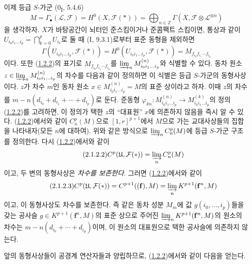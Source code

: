 \begin{env}[2.1.2]
\label{III.2.1.2-fr}
이제 등급 $S$-가군 (0\textsubscript{I}, 5.4.6)
\begin{equation}
\label{III.2.1.2.1-fr}
\tag{2.1.2.1}
M=\Gamma_\bullet(\mathcal L,\mathcal F)
=H^0(X,\mathcal F(*))
=\bigoplus_{n\in\mathbb Z}
\Gamma(X,\mathcal F\otimes\mathcal L^{\otimes n})
\end{equation}
을 생각하자.
$X$가 바탕공간이 뇌터인 준스킴이거나 준콤팩트 스킴이면, 통상과 같이
$U_{i_0i_1\ldots i_p}=\bigcap_{k=0}^pU_{i_k}$로 둘 때 (I, 9.3.1)로부터
표준 동형을 제외하면
\[
\Gamma(U_{i_0i_1\ldots i_p},\mathcal F(*))
=H^0(U_{i_0i_1\ldots i_p},\mathcal F(*))
=M_{f_{i_0}f_{i_1}\cdots f_{i_p}}
\]
이다. 또한 (\hyperref[III.1.2.2-fr]{1.2.2})의 표기로
$M_{f_{i_0}f_{i_1}\cdots f_{i_p}}$를
$\varinjlim_n M_{i_0i_1\ldots i_p}^{(n)}$와 식별할 수 있다. 동차 원소
$z\in\varinjlim_n M_{i_0i_1\ldots i_p}^{(n)}$의 차수를 다음과 같이
정의하면 이 식별은 등급 $S$-가군의 동형사상이다. $z$가 차수 $m$인
동차 원소
$x\in M_{i_0i_1\ldots i_p}^{(n)}=M$의 표준 상이라고 하자. 이때
$z$의 차수를
$m-n(d_{i_0}+d_{i_1}+\cdots+d_{i_p})$로 둔다. 준동형
$\varphi_{kn}:M_{i_0i_1\ldots i_p}^{(n)}\to
M_{i_0i_1\ldots i_p}^{(k)}$의 정의
(\hyperref[III.1.2.2-fr]{1.2.2})를 고려하면, 이 정의가 택한 $z$의
``대표원'' $x$에 의존하지 않음을 즉시 알 수 있다.
(\hyperref[III.1.2.2-fr]{1.2.2})에서와 같이 $C_n^p(M)$으로
$[1,r]^{p+1}$에서 $M$으로 가는 교대사상들의 집합을 나타내자(모든
$n$에 대하여). 위와 같은 방식으로 $\varinjlim_n C_n^p(M)$에 등급
$S$-가군 구조를 정의한다. 다시
(\hyperref[III.1.2.2-fr]{1.2.2})에서와 같이
\begin{equation}
\label{III.2.1.2.2-fr}
\tag{2.1.2.2}
C^p(\mathfrak U,\mathcal F(*))=\varinjlim_n C_n^p(M)
\end{equation}
이고, 두 변의 동형사상은 \emph{차수를 보존한다}. 그러면
(\hyperref[III.1.2.2-fr]{1.2.2})에서와 같이
\begin{equation}
\label{III.2.1.2.3-fr}
\tag{2.1.2.3}
C^p(\mathfrak U,\mathcal F(*))
=C^{p+1}((\mathbf f),M)
=\varinjlim_n K^{p+1}(\mathbf f^n,M)
\end{equation}
이고, 이 동형사상도 차수를 보존한다. 즉 같은 동차 성분 $M_m$에 값
$g(i_0,\ldots,i_p)$들을 갖는 공사슬
$g\in K^{p+1}(\mathbf f^n,M)$의 표준 상으로 주어진
$\varinjlim_n K^{p+1}(\mathbf f^n,M)$의 원소의 차수는
$m-n(d_{i_0}+\cdots+d_{i_p})$이며, 이 원소의 대표원으로 택한 공사슬에
의존하지 않는다.
\end{env}

앞의 동형사상들이 공경계 연산자들과 양립하므로,
(\hyperref[III.1.2.2-fr]{1.2.2})에서와 같이 다음을 얻는다.

